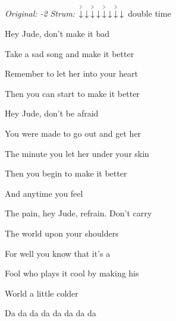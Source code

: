 \begin{song}


\begin{headerbox}
\RaiseBoxWithAccents
\textit{Original: -2} \quad
\textit{Strum:} $\AccentDown\Down\AccentDown\Down\AccentDown\Down\AccentDown\Down$ double time
\end{headerbox}

\begin{vchordbox}
\end{vchordbox}

\Large

\bigskip

Hey Jude, don’t make it bad \par
Take a sad song and make it better \par
Remember to let her into your heart \par
Then you can start to make it better \par

\bigskip

Hey Jude, don’t be afraid \par
You were made to go out and get her \par
The minute you let her under your skin \par
Then you begin to make it better \par

\bigskip

 And anytime you feel \par
The pain, hey Jude, refrain. Don’t carry \par
The world upon your shoulders \par
{} For well you know that it's a \par
{}Fool who plays it cool by making his \par
{}World a little colder \par

\bigskip

Da da da da da da da da \par


\end{song}

